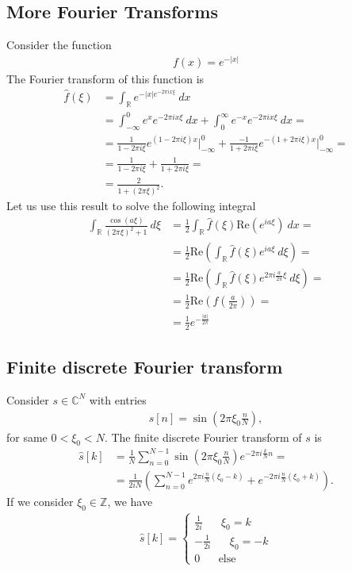 \documentclass[a4paper]{article}
\begin{document}
\subsection{More Fourier Transforms}
Consider the function
\begin{align}
    f(x) = e^{-|x|}
\end{align}
The Fourier transform of this function is
\begin{align}
    \hat{f}(\xi)
    &=\int_\mathbb{R} e^{-|x| e^{-2\pi i x \xi}}\ dx\\
    &= \int_{-\infty}^0 e^x e^{-2\pi i x \xi}\ dx
    + \int_0^\infty e^{-x} e^{-2\pi i x \xi}\ dx=\\
    &= \frac{1}{1-2\pi i \xi} e^{(1-2\pi i \xi) x}\bigg|_{-\infty}^0+
        \frac{-1}{1+2\pi i \xi} e^{-(1+2\pi i \xi) x}\bigg|_{-\infty}^0 = \\
    &= \frac{1}{1-2\pi i \xi} + \frac{1}{1 + 2\pi i \xi} =\\
    &= \frac{2}{1+(2\pi \xi)^2}.
\end{align}
Let us use this result to solve the following integral
\begin{align}
    \int_\mathbb{R} \frac{\cos(a\xi)}{(2\pi \xi)^2 + 1}\ d\xi &=
    \frac{1}{2}\int_\mathbb{R} \hat{f}(\xi) \text{Re}(e^{ia\xi})\ dx=\\
    &= \frac{1}{2}\text{Re}\left(
        \int_\mathbb{R}\hat{f}(\xi)e^{ia\xi}\ d\xi
    \right)=\\
    &= \frac{1}{2}\text{Re}\left(
        \int_\mathbb{R} \hat{f}(\xi) e^{2\pi i \frac{a}{2\pi}\xi}\ d\xi
    \right)=\\
    &= \frac{1}{2}\text{Re}\left(f(\frac{a}{2\pi})\right)=\\
    &= \frac{1}{2} e^{-\frac{|a|}{2\pi}}
\end{align}
\subsection{Finite discrete Fourier transform}
Consider $s\in \mathbb{C}^N$ with entries
\begin{align}
    s[n] = \sin\left(2\pi\xi_0\frac{n}{N}\right),
\end{align}
for same $0 < \xi_0 < N$. The finite discrete Fourier transform of $s$ is
\begin{align}
    \hat{s}[k] &= \frac{1}{N} \sum_{n=0}^{N-1} \sin\left(2\pi\xi_0\frac{n}{N}\right)
            e^{-2\pi i \frac{k}{N} n}  =\\
        &=\frac{1}{2iN}\left(
            \sum_{n=0}^{N-1}e^{2\pi i \frac{n}{N}(\xi_0 -k)} + e^{-2\pi i
            \frac{n}{N}(\xi_0 +k)}
            \right).
\end{align}
If we consider $\xi_0 \in \mathbb{Z}$, we have
\begin{align}
    \hat{s}[k] =
    \begin{cases}
        \frac{1}{2i}\;\;\;\;\;\; \xi_0 = k\\
        -\frac{1}{2i}\;\;\;\;\;\; \xi_0 = -k\\
        0   \;\;\;\;\;\; \text{else}
    \end{cases}
\end{align}
\end{document}
